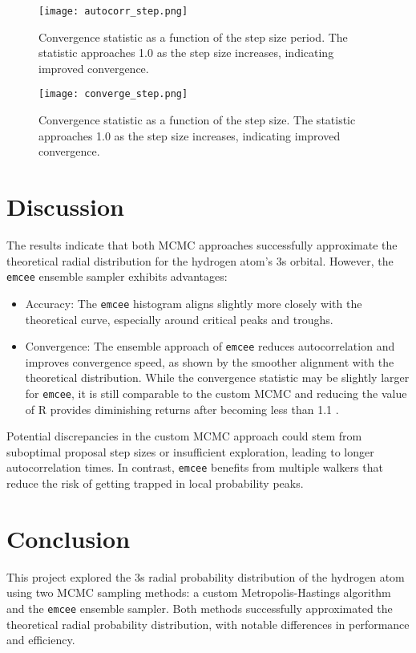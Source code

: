 \documentclass[twocolumn, 11pt]{article}
\begin{document}
\begin{figure}[h!]
    \centering
    \texttt{[image: autocorr\_step.png]}
    \caption{Convergence statistic as a function of the step size period. The statistic approaches 1.0 as the step size increases, indicating improved convergence.}
    \label{fig:autocorr_step}
\end{figure}

\begin{figure}[h!]
    \centering
    \texttt{[image: converge\_step.png]}
    \caption{Convergence statistic as a function of the step size. The statistic approaches 1.0 as the step size increases, indicating improved convergence.}
    \label{fig:convergence_step}
\end{figure}

\section*{Discussion}
The results indicate that both MCMC approaches successfully approximate the theoretical radial distribution for the hydrogen atom's 3s orbital. However, the \texttt{emcee} ensemble sampler exhibits advantages:
\begin{itemize}
    \item Accuracy: The \texttt{emcee} histogram aligns slightly more closely with the theoretical curve, especially around critical peaks and troughs.
    \item Convergence: The ensemble approach of \texttt{emcee} reduces autocorrelation and improves convergence speed, as shown by the smoother alignment with the theoretical distribution. While the convergence statistic may be slightly larger for \texttt{emcee}, it is still comparable to the custom MCMC and reducing the value of R provides diminishing returns after becoming less than 1.1 .
\end{itemize}

Potential discrepancies in the custom MCMC approach could stem from suboptimal proposal step sizes or insufficient exploration, leading to longer autocorrelation times. In contrast, \texttt{emcee} benefits from multiple walkers that reduce the risk of getting trapped in local probability peaks.

\section*{Conclusion}
This project explored the 3s radial probability distribution of the hydrogen atom using two MCMC sampling methods: a custom Metropolis-Hastings algorithm and the \texttt{emcee} ensemble sampler. Both methods successfully approximated the theoretical radial probability distribution, with notable differences in performance and efficiency.
\end{document}
